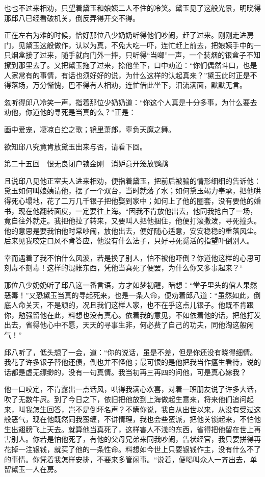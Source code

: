 \documentclass[12pt,UTF8]{ctexbook}
\begin{document}
{{{也也不过来相劝，只望着黛玉和娘姨二人不住的冷笑。黛玉见了这般光景，明晓得那邱八已经看破机关，倒反弄得开交不得。

正在左右为难的时候，恰好那位八少奶奶听得他们吵闹，赶了过来。刚刚走进房门，见黛玉这般做作，认以为真，不免大吃一吓，连忙赶上前去，把娘姨手中的一只烟盒接了过来，随手就向门外一摔，只听得“当啷”一声，一个装烟的银盒子不知撩到那里去了。又把黛玉拖了过来，捺他坐下，口中劝道：“你们偶然斗口，也是人家常有的事情，有话也须好好的说，为什么这样的认起真来？”黛玉此时正是不得落场，万分惭愧，巴不得有人相劝，连忙借此坐下，泪流满面，默默无言。

忽听得邱八冷笑一声，指着那位少奶奶道：“你这个人真是十分多事，为什么要去劝他，你道他的寻死是当真的么？”正是：

画中爱宠，凄凉白纻之歌；镜里萧郎，辜负天魔之舞。

欲知邱八究竟肯放黛玉出来与否，请看下回。





第二十五回　恨无良闭户锁金刚　消妒意开笼放鹦鹉





且说邱八见他正室夫人进来相劝，便指着黛玉，把前后被骗的情形细细的告诉他：黛玉如何叫娘姨请他，摆了一个双台，当时就落了水；如何黛玉竭力奉承，把他哄得死心塌地，花了二万几千银子把他娶到家中；如何上了他的圈套，没有要他的婚书，现在他翻转面皮，一定要往上海。“因我不肯放他出去，他同我抢白了一场，竟自往外就走。我把他拉了转来，又要叫人把他捆住，他便打滚撒泼，寻死撞头。他的意思是要我怕他时常吵闹，放他出去，便好随心适意，安安稳稳的重落风尘。后来见我咬定口风不肯答应，他没有什么法子，只好寻死觅活的指望吓倒别人。

幸而遇着了我不怕什么风波，若是换了别人，怕不被他吓倒？你道他这样的心思可刻毒不刻毒！这样的混帐东西，凭他当真死了便罢，为什么你又多事起来？“

那位八少奶奶听了邱八这一番言语，方才如梦初醒，暗想：“堂子里头的倌人果然恶毒！”又恐黛玉当真的寻起死来，也是一条人命，便劝着邱八道：“虽然如此，倒底人命关天，不是顽的，况且我们这样人家，也不在乎这点儿银子。他既不肯跟你，勉强留他在此，料想也没有真心。依着我的意见，不如依着他的话，把他打发出去，省得他心中不愿，天天的寻事生非，何必费了自己的功夫，同他淘这般闲气！”

邱八听了，低头想了一会，道：“你的说话，虽是不差，但是你还没有晓得细情。我花了许多银子替他还债，倒也并不怪他；最可恨的是他把我当作瘟生看待，说的话都是虚无缥缈的，没有一句真情。我当初再三再四的问他，可是真心嫁我？

他一口咬定，不肯露出一点话风，哄得我满心欢喜，对着一班朋友说了许多大话，吹了无数牛屄。到了今日之下，依旧把他放到上海做起生意来，将来他们追问起来，叫我怎生回答，岂不是倒坏名声？不瞒你说，我自从出世以来，从没有受过这般恶气，现在他既然同我蛮缠，不讲情理，我也会些蛮派，把他关锁起来，不怕他生出翅膀飞上天去。就算他当真死了，这样害人不浅的东西，省得把他留在世上再害别人。你若是怕他死了，有他的父母兄弟来同我吵闹，告状经官，我只要拼得再花掉一注银钱，就买了他的一条性命。料想如今世上只要银钱作主，没有什么不了的事情。你凭着我怎样安排，不要来多管闲事。“说着，便喝叫众人一齐出去，单留黛玉一人在房。

}}}
\end{document}
